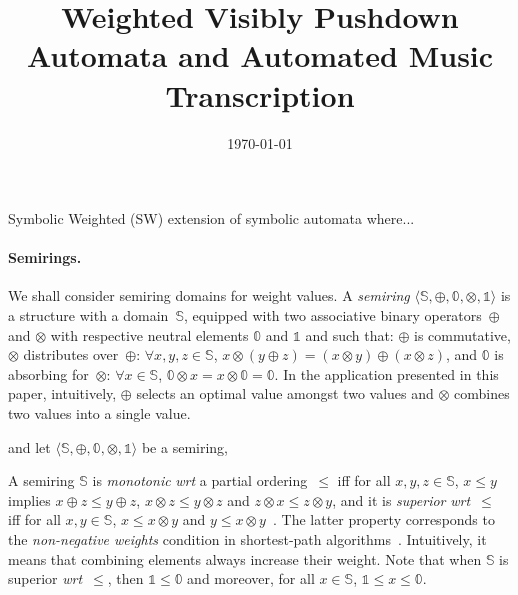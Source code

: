 \documentclass[a4paper,11pt]{article}
\title{Weighted Visibly Pushdown Automata and Automated Music Transcription}
\date{\today}
\def\wrt{\textit{wrt}\xspace}
\def\<#1>{\langle #1 \rangle}
\newcommand{\Semiring}{\mathbb{S}}
\newcommand{\zero}{\mathbb{0}}
\newcommand{\one}{\mathbb{1}}
\begin{document}
\thispagestyle{empty}
\maketitle
\abstract{\ldots}


Symbolic Weighted (SW) extension of symbolic automata where...



\paragraph{Semirings.}
We shall consider semiring domains for weight values.
%
A \emph{semiring} $\< \Semiring, \oplus, \zero, \otimes, \one>$ 
is a structure with a domain~$\Semiring$,
equipped with two associative
binary operators~$\oplus$ and $\otimes$
with respective neutral elements $\zero$ and $\one$ and such that:
$\oplus$ is commutative, 
$\otimes$ distributes over~$\oplus$:  $\forall x, y, z \in \mathbb{S}$,
$x \otimes (y \oplus z) = (x \otimes y) \oplus (x \otimes z)$, 
and $\zero$ is absorbing for~$\otimes$: 
$\forall x\in \mathbb{S}$, $\zero \otimes x = x \otimes \zero = \zero$.
%
In the application presented in this paper, intuitively,
$\oplus$ selects an optimal value amongst two values and 
$\otimes$ combines two values into a single value.

and let $\< \Semiring, \oplus, \zero, \otimes, \one>$ be a {semiring}, 


A semiring $\Semiring$ 
is \emph{monotonic} \wrt a partial ordering~$\leq$ 
iff for all $x, y, z  \in \Semiring$,  $x \leq y$ implies
$x \oplus z \leq y \oplus z$,
$x \otimes z \leq y \otimes z$
and $z \otimes x \leq z \otimes y$,
%
and it is \emph{superior} %
\wrt~$\leq$ iff for all $x, y \in \Semiring$,  
$x \leq x \otimes y$ and 
$y \leq x \otimes y$~\cite{Huang08advanceddynamic}.
The latter property corresponds to the 
\emph{non-negative weights} condition in shortest-path algorithms~\cite{Dijkstra59anote}.
Intuitively, it means that combining elements always increase their weight. 
Note that when $\Semiring$ is superior \wrt~$\leq$, then $\one \leq \zero$
and moreover, for all $x \in \Semiring$, $\one \leq x \leq \zero$.
\end{document}
